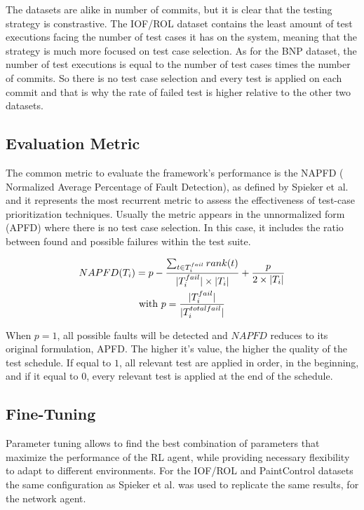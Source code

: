 The datasets are alike in number of commits, but it is clear that the testing strategy is constrastive. The IOF/ROL dataset contains the least amount of test executions facing the number of test cases it has on the system, meaning that the strategy is much more focused on test case selection. As for the BNP dataset, the number of test executions is equal to the number of test cases times the number of commits. So there is no test case selection and every test is applied on each commit and that is why the rate of failed test is higher relative to the other two datasets. 


\subsection{Evaluation Metric}\label{eval}

The common metric to evaluate the framework's performance is the NAPFD ( Normalized Average Percentage of Fault Detection), as defined by Spieker et al. \cite{Spieker} and it represents the most recurrent metric to assess the effectiveness of test-case prioritization techniques. Usually the metric appears in the unnormalized form (APFD) where there is no test case selection. In this case, it includes the ratio between found and possible failures within the test suite. 

\begin{gather*}
	NAPFD(T_i) = p - \frac{\sum_{\substack{t \in T_i^{fail}}} rank(t)}{\lvert T_i^{fail}\rvert \times \lvert T_i\rvert} + \frac{p}{2 \times \lvert T_i\rvert} \\
	\text{with $p = \frac{\lvert T_i^{fail}\rvert}{\lvert T_i^{total fail}\rvert}$}
\end{gather*}

When $p=1$, all possible faults will be detected and $NAPFD$ reduces to its original formulation, APFD. The higher it's value, the higher the quality of the test schedule. If equal to $1$, all relevant test are applied in order, in the beginning, and if it equal to $0$, every relevant test is applied at the end of the schedule.

\subsection{Fine-Tuning}\label{tune}

Parameter tuning allows to find the best combination of parameters that maximize the performance of the RL agent, while providing necessary flexibility to adapt to different environments. 
For the IOF/ROL and PaintControl datasets the same configuration as Spieker et al. \cite{Spieker} was used to replicate the same results, for the network agent. 

